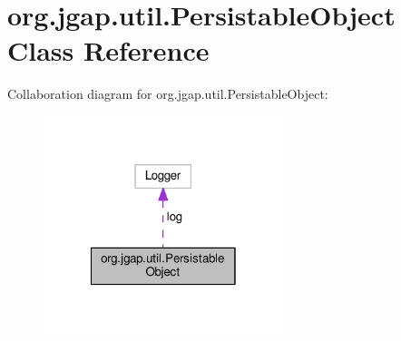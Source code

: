 \hypertarget{classorg_1_1jgap_1_1util_1_1_persistable_object}{\section{org.\-jgap.\-util.\-Persistable\-Object Class Reference}
\label{classorg_1_1jgap_1_1util_1_1_persistable_object}
}


Collaboration diagram for org.\-jgap.\-util.\-Persistable\-Object\-:
\nopagebreak
\begin{figure}[H]
\begin{center}
\leavevmode
\includegraphics[width=198pt]{classorg_1_1jgap_1_1util_1_1_persistable_object__coll__graph}
\end{center}
\end{figure}
